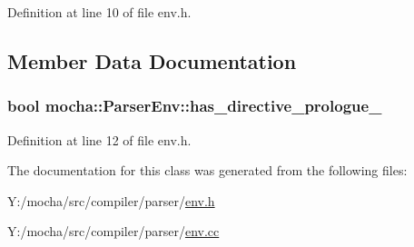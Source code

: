 Definition at line 10 of file env.h.



\subsection{Member Data Documentation}
\hypertarget{classmocha_1_1_parser_env_ae2c7e63719d25376084e4b84b2c7dff7}{
\subsubsection[{has\_\-directive\_\-prologue\_\-}]{\setlength{\rightskip}{0pt plus 5cm}bool {\bf mocha::ParserEnv::has\_\-directive\_\-prologue\_\-}}}
\label{classmocha_1_1_parser_env_ae2c7e63719d25376084e4b84b2c7dff7}


Definition at line 12 of file env.h.



The documentation for this class was generated from the following files:\begin{DoxyCompactItemize}
\item 
Y:/mocha/src/compiler/parser/\hyperlink{env_8h}{env.h}\item 
Y:/mocha/src/compiler/parser/\hyperlink{env_8cc}{env.cc}\end{DoxyCompactItemize}
